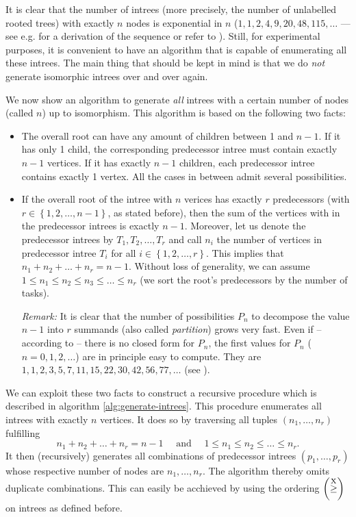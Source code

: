 It is clear that the number of intrees (more precisely, the number of unlabelled rooted trees) with exactly $n$ nodes is exponential in $n$ ($1, 1, 2, 4, 9, 20, 48, 115,\dots$ --- see e.g. \cite{flajolet2009analytic} for a derivation of the sequence or refer to \cite{oeisrootedtrees}). Still, for experimental purposes, it is convenient to have an algorithm that is capable of enumerating all these intrees. The main thing that should be kept in mind is that we do \emph{not} generate isomorphic intrees over and over again.

We now show an algorithm to generate \emph{all} intrees with a certain number of nodes (called $n$) up to isomorphism. This algorithm is based on the following two facts: 

\begin{itemize}
  \item The overall root can have any amount of children between 1 and $n-1$. If it has only 1 child, the corresponding predecessor intree must contain exactly $n-1$ vertices. If it has exactly $n-1$ children, each predecessor intree contains exactly 1 vertex. All the cases in between admit several possibilities.
  \item If the overall root of the intree with $n$ verices has exactly $r$ predecessors (with $r \in \left\{ 1,2,\dots,n-1 \right\}$, as stated before), then the sum of the vertices with in the predecessor intrees is exactly $n-1$. Moreover, let us denote the predecessor intrees by $T_1,T_2,\dots,T_r$ and call $n_i$ the number of vertices in predecessor intree $T_i$ for all $i\in\left\{1,2,\dots,r \right\}$. This implies that $n_1+n_2+\dots+n_r=n-1$. Without loss of generality, we can assume $1 \leq n_1 \leq n_2 \leq n_3 \leq \dots \leq n_r$ (we sort the root's predecessors by the number of tasks).

    \emph{Remark:} It is clear that the number of possibilities $P_n$ to decompose the value $n-1$ into $r$ summands (also called \emph{partition}) grows very fast. Even if -- according to \cite{concretemathematics} -- there is no closed form for $P_n$, the first values for $P_n$ ($n=0,1,2,\dots$) are in principle easy to compute. They are $1,1,2,3,5,7,11,15,22,30,42,56,77,\dots$ (see \cite{oeispartitionnumbers}).
\end{itemize}

We can exploit these two facts to construct a recursive procedure which is described in algorithm \ref{alg:generate-intrees}. This procedure enumerates all intrees with exactly $n$ vertices. It does so by traversing all tuples $(n_1,\dots,n_r)$ fulfilling
\begin{equation*}
  n_1 + n_2 + \dots + n_r = n-1 \quad \text{ and } \quad 1\leq n_1\leq n_2\leq\dots\leq n_r.
\end{equation*}
It then (recursively) generates all combinations of predecessor intrees $(p_1,\dots,p_r)$ whose respective number of nodes are $n_1,\dots,n_r$. The algorithm thereby omits duplicate combinations. This can easily be acchieved by using the ordering $\left(\stackrel{\text{X}}{\geq}\right)$ on intrees as defined before.

